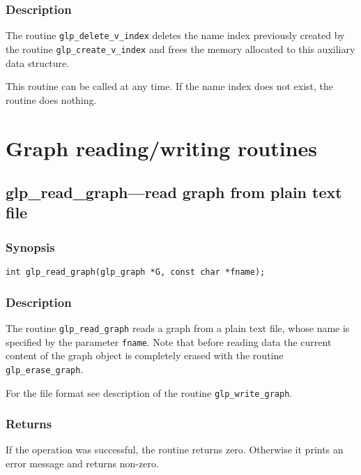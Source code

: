 \documentclass[dvipdfm,11pt]{report}
\begin{document}
\subsubsection*{Description}

The routine \verb|glp_delete_v_index| deletes the name index previously
created by the routine \verb|glp_create_v_index| and frees the memory
allocated to this auxiliary data structure.

This routine can be called at any time. If the name index does not
exist, the routine does nothing.

\newpage

\section{Graph reading/writing routines}

\subsection{glp\_read\_graph---read graph from plain text file}

\subsubsection*{Synopsis}

\begin{verbatim}
int glp_read_graph(glp_graph *G, const char *fname);
\end{verbatim}

\subsubsection*{Description}

The routine \verb|glp_read_graph| reads a graph from a plain text file,
whose name is specified by the parameter \verb|fname|. Note that before
reading data the current content of the graph object is completely
erased with the routine \verb|glp_erase_graph|.

For the file format see description of the routine
\verb|glp_write_graph|.

\subsubsection*{Returns}

If the operation was successful, the routine returns zero. Otherwise
it prints an error message and returns non-zero.
\end{document}
